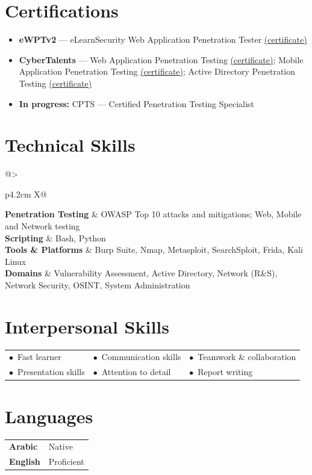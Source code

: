 \documentclass[11pt,a4paper]{article}
\newcommand{\skillrow}[2]{\textbf{#1} & #2 \\[3pt]}
\begin{document}
\section{Certifications}
\begin{itemize}[leftmargin=1.2em,itemsep=1pt,topsep=2pt]
  \item \textbf{eWPTv2} --- eLearnSecurity Web Application Penetration Tester \href{https://certs.ine.com/85adc2a2-9344-4a6d-a276-5653d15267c2\#acc.fApd1TeR}{(certificate)}
  \item \textbf{CyberTalents} --- Web Application Penetration Testing \href{https://cybertalents.com/certifications/4959bf05-eabf-41a3-98ad-d55bd0d35f8c}{(certificate)}; Mobile Application Penetration Testing \href{https://cybertalents.com/certifications/49e097e9-173f-4a6d-bde8-f32251b2282c}{(certificate)}; Active Directory Penetration Testing \href{https://cybertalents.com/certifications/e976caf4-b8a5-4b0c-a33c-896ccbd770c7}{(certificate)}
  \item \textbf{In progress:} CPTS --- Certified Penetration Testing Specialist
\end{itemize}

\section{Technical Skills}
\begin{tabularx}{\linewidth}{@{}>{\raggedright\arraybackslash}p{4.2cm} X@{}}
\skillrow{Penetration Testing}{OWASP Top 10 attacks and mitigations; Web, Mobile and Network testing}
\skillrow{Scripting}{Bash, Python}
\skillrow{Tools \& Platforms}{Burp Suite, Nmap, Metasploit, SearchSploit, Frida, Kali Linux}
\skillrow{Domains}{Vulnerability Assessment, Active Directory, Network (R\&S), Network Security, OSINT, System Administration}
\end{tabularx}

\section{Interpersonal Skills}
\begin{tabularx}{\linewidth}{@{}>{\raggedright\arraybackslash}X >{\raggedright\arraybackslash}X >{\raggedright\arraybackslash}X@{}}
$\bullet$~Fast learner & $\bullet$~Communication skills & $\bullet$~Teamwork \& collaboration \\[2pt]
$\bullet$~Presentation skills & $\bullet$~Attention to detail & $\bullet$~Report writing \\
\end{tabularx}

\section{Languages}
\begin{tabularx}{\linewidth}{@{}>{\raggedright\arraybackslash}p{4.2cm} X@{}}
\textbf{Arabic} & Native \\[3pt]
\textbf{English} & Proficient \\
\end{tabularx}
\end{document}
